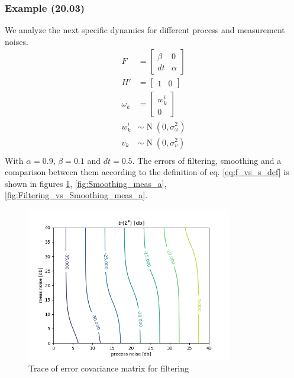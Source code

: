 \documentclass[oneside,12pt]{article}
\begin{document}
\subsubsection{Example (20.03)}
We analyze the next specific dynamics for different process and measurement noises.
\begin{equation}
    \begin{split}
        F &= \begin{bmatrix} \beta & 0 \\ dt & \alpha \end{bmatrix}\\
        H' &= \begin{bmatrix} 1 & 0\end{bmatrix}\\
        \omega_k &= \begin{bmatrix} w_k^i \\ 0 \end{bmatrix}\\
        w_k^i &\sim \operatorname{N}(0, \sigma_\omega^2)\\
        v_k &\sim \operatorname{N}(0, \sigma_v^2)\\
    \end{split}
\end{equation}
%
With $\alpha = 0.9$, $\beta = 0.1$ and $dt=0.5$. The errors of filtering, smoothing and a comparison between them according to the definition of eq. \ref{eq:f_vs_s_def} is shown in figures \ref{fig:Filtering_meas_a}, \ref{fig:Smoothing_meas_a}, \ref{fig:Filtering_vs_Smoothing_meas_a}.
%
\begin{figure}
    \centering
        \includegraphics[width=0.8\textwidth]{./Filtering_meas_a}
        \caption{\label{fig:Filtering_meas_a}Trace of error covariance matrix for filtering}
\end{figure}
\end{document}
